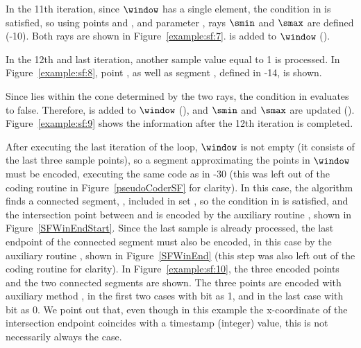 

\clearpage


In the 11th iteration, since $\window$ has a single element, the condition in  is satisfied, so using points \snapshot and , and parameter \maxerror, rays $\smin$ and $\smax$ are defined (-10). Both rays are shown in Figure~\ref{example:sf:7}.  is added to $\window$ (). 


\vspace{+5pt}


In the 12th and last iteration, another sample value equal to 1 is processed. In Figure~\ref{example:sf:8}, point , as well as segment , defined in -14, is shown.


\vspace{+5pt}


\clearpage


Since  lies within the cone determined by the two rays, the condition in  evaluates to false. Therefore,  is added to $\window$ (), and $\smin$ and $\smax$ are updated (). Figure~\ref{example:sf:9}  shows the information after the 12th iteration is completed.




After executing the last iteration of the loop, $\window$ is not empty (it consists of the last three sample points), so a segment approximating the points in $\window$ must be encoded, executing the same code as in -30 (this was left out of the coding routine in Figure~\ref{pseudoCoderSF} for clarity). In this case, the algorithm finds a connected segment, \segmentConnT, included in set \segmentSet, so the condition in  is satisfied, and the intersection point between \segmentLastT and \segmentConnT is encoded by the auxiliary routine \SFEncodeWinEndStart, shown in Figure~\ref{SFWinEndStart}. Since the last sample is already processed, the last endpoint of the connected segment must also be encoded, in this case by the auxiliary routine \SFWinEndP, shown in Figure~\ref{SFWinEnd} (this step was also left out of the coding routine for clarity). In Figure~\ref{example:sf:10}, the three encoded points and the two connected segments are shown. The three points are encoded with auxiliary method \SFEncodePoint, in the first two cases with bit \connectedS as 1, and in the last case with bit \connectedS as 0. We point out that, even though in this example the x-coordinate of the intersection endpoint coincides with a timestamp (integer) value, this is not necessarily always the case.


